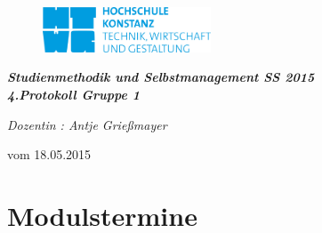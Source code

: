 \documentclass[11pt,a4paper]{article}
\begin{document}
	\begin{figure}
  	\hspace*{-15.0mm} {\includegraphics[width=50mm]{logo}}
  	\end{figure}
  
\hspace{10mm}
\begin{center}

\textit{\textbf{\Huge{ Studienmethodik und Selbstmanagement  SS 2015}}}\\
\emph{\textbf{4.Protokoll Gruppe 1} }
\begin{flushleft}
\textit{ Dozentin :  Antje Grießmayer }
\end{flushleft}

\end{center}
\begin{flushright}
vom 18.05.2015
\end{flushright}
\section*{Modulstermine}
\end{document}

